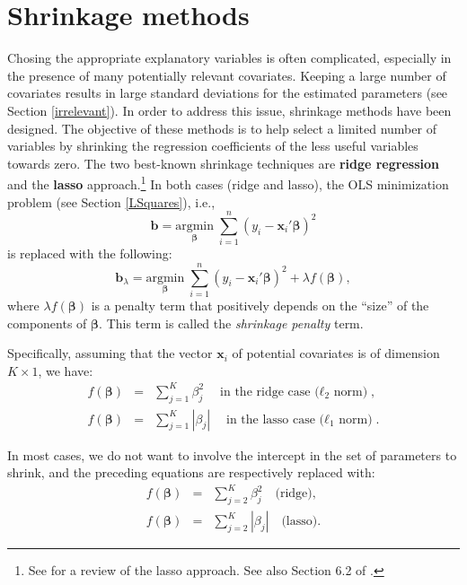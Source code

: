 \documentclass[
  12pt,
]{book}
\theoremstyle{definition}
\theoremstyle{definition}
\theoremstyle{definition}
\theoremstyle{definition}
\theoremstyle{remark}
\begin{document}
\hypertarget{shrinkage-methods}{%
\section{Shrinkage methods}\label{shrinkage-methods}}

Chosing the appropriate explanatory variables is often complicated, especially in the presence of many potentially relevant covariates. Keeping a large number of covariates results in large standard deviations for the estimated parameters (see Section \ref{irrelevant}). In order to address this issue, shrinkage methods have been designed. The objective of these methods is to help select a limited number of variables by shrinking the regression coefficients of the less useful variables towards zero. The two best-known shrinkage techniques are \textbf{ridge regression} and the \textbf{lasso} approach.\footnote{See \citet{Tibshirani_2011} for a review of the lasso approach. See also Section 6.2 of \citet{James2013}.} In both cases (ridge and lasso), the OLS minimization problem (see Section \ref{LSquares}), i.e.,
\begin{equation}
\mathbf{b} = \underset{\boldsymbol\beta}{\mbox{argmin}}\; \sum_{i=1}^n(y_i - \mathbf{x}_i'\boldsymbol\beta)^2
\end{equation}
is replaced with the following:
\begin{equation}
\mathbf{b}_\lambda = \underset{\boldsymbol\beta}{\mbox{argmin}}\; \sum_{i=1}^n(y_i - \mathbf{x}_i'\boldsymbol\beta)^2 + \lambda f(\boldsymbol\beta),\label{eq:minLasso}
\end{equation}
where \(\lambda f(\boldsymbol\beta)\) is a penalty term that positively depends on the ``size'' of the components of \(\boldsymbol\beta\). This term is called the \emph{shrinkage penalty} term.

Specifically, assuming that the vector \(\mathbf{x}_i\) of potential covariates is of dimension \(K \times 1\), we have:
\begin{eqnarray*}
f(\boldsymbol\beta) & = & \sum_{j=1}^K \beta_j^2 \quad \mbox{in the ridge case ($\ell_2$ norm)},\\
f(\boldsymbol\beta) & = & \sum_{j=1}^K |\beta_j| \quad \mbox{in the lasso case ($\ell_1$ norm)}.
\end{eqnarray*}

In most cases, we do not want to involve the intercept in the set of parameters to shrink, and the preceding equations are respectively replaced with:
\begin{eqnarray*}
f(\boldsymbol\beta) & = & \sum_{j=2}^K \beta_j^2 \quad \mbox{(ridge)},\\
f(\boldsymbol\beta) & = & \sum_{j=2}^K |\beta_j| \quad \mbox{(lasso)}.
\end{eqnarray*}
\end{document}
